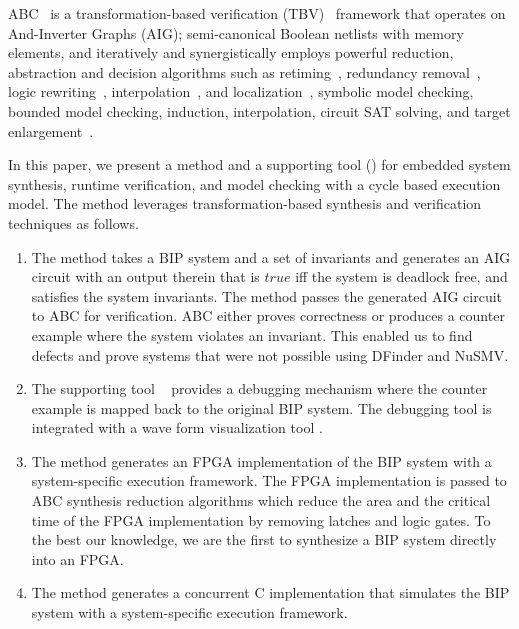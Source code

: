 ABC~\cite{brayton2010abc} is a transformation-based 
verification (TBV)~\cite{KuBa01} framework that operates on 
And-Inverter Graphs (AIG); semi-canonical Boolean netlists with
memory elements, and iteratively and synergistically 
employs powerful reduction, abstraction and decision algorithms such as 
retiming~\cite{KuBa01}, 
redundancy removal~\cite{HmBPK05,KuMP01,BjesseC00,aziz-fmsd-00}, 
logic rewriting~\cite{BjBo04}, interpolation~\cite{McMillan03}, 
and localization~\cite{Wang03}, 
symbolic model checking, bounded model checking, induction, 
interpolation, circuit SAT solving, 
and target enlargement~\cite{MoGS00,MoMZ01,HoSH00,BaKuAb02,Hari05expert}.

In this paper, we present a method and a supporting tool (\biptool)
for embedded system synthesis, runtime verification,
and model checking with a cycle based execution model.
The method leverages transformation-based synthesis and verification techniques 
as follows. 

\begin{enumerate}
\item The method takes a BIP system and a set of invariants and generates 
  an AIG circuit with an output therein that is $\mathit{true}$ iff the system 
  is deadlock free, and satisfies the system invariants. 
  The method passes the generated AIG circuit to ABC for verification. 
  ABC either proves correctness or produces a counter example where the 
  system violates an invariant. 
  This enabled us to find defects and prove systems that were not 
  possible using DFinder and NuSMV. 
\item  The supporting tool \biptool~ provides a debugging mechanism where the 
  counter example is mapped back to the original BIP system. 
  The debugging tool is integrated with a wave form visualization tool \cite{bybell2010gtkwave}.  
\item The method generates an FPGA implementation of the BIP system with a 
  system-specific execution framework. 
  The FPGA implementation is passed to ABC synthesis reduction algorithms 
  which reduce the area and the critical time of the FPGA implementation 
  by removing latches and logic gates. 
  To the best our knowledge, we are the first to synthesize a BIP system directly 
  into an FPGA. 
\item The method generates a concurrent C implementation that simulates the BIP 
  system with a system-specific execution framework. 
\end{enumerate}


